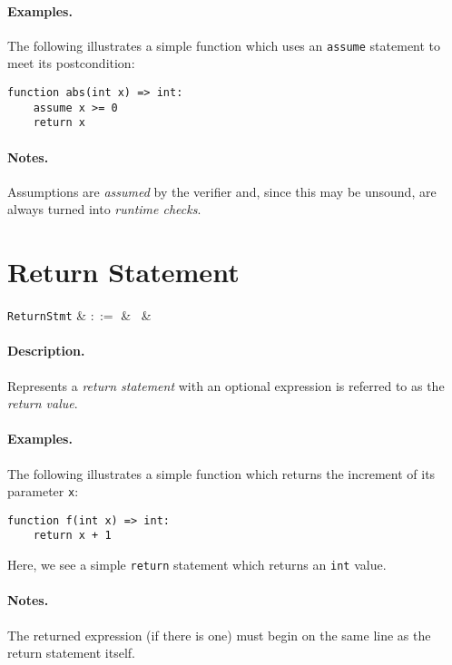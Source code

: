 \paragraph{Examples.}  The following illustrates a simple function
which uses an \lstinline{assume} statement to meet its
postcondition:

\begin{lstlisting}
function abs(int x) => int:
    assume x >= 0
    return x
\end{lstlisting}

\paragraph{Notes.} Assumptions are {\em assumed} by the verifier and, since
this may be unsound, are always turned into {\em runtime checks}.


\section{Return Statement}

\begin{syntax}
  \verb+ReturnStmt+ & $::=$ & \  &\\
\end{syntax}

\paragraph{Description.}  Represents a {\em return statement} with an
optional expression is referred to as the {\em return value}.

\paragraph{Examples.} The following illustrates a simple function
which returns the increment of its parameter \lstinline{x}:

\begin{lstlisting}
function f(int x) => int:
    return x + 1
\end{lstlisting}

Here, we see a simple \lstinline{return} statement which returns an \lstinline{int} value.

\paragraph{Notes.}  The returned expression (if there is one) must
begin on the same line as the return statement itself.

